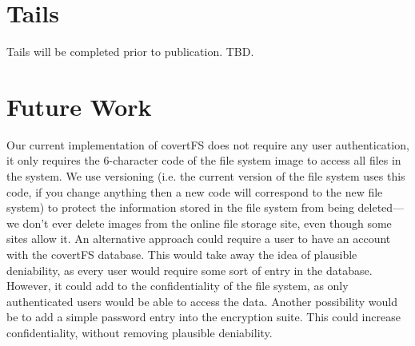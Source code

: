 \documentclass[12pt,journal,compsoc]{IEEEtran}
\begin{document}





\section{Tails}

Tails will be completed prior to publication. TBD. 

\section{Future Work}
Our current implementation of covertFS does not require any user authentication, it only requires the 6-character code of the file system image to access all files in the system. We use versioning (i.e. the current version of the file system uses this code, if you change anything then a new code will correspond to the new file system) to protect the information stored in the file system from being deleted--- we don't ever delete images from the online file storage site, even though some sites allow it. An alternative approach could require a user to have an account with the covertFS database. This would take away the idea of plausible deniability, as every user would require some sort of entry in the database. However, it could add to the confidentiality of the file system, as only authenticated users would be able to access the data.
Another possibility would be to add a simple password entry into the encryption suite. This could increase confidentiality, without removing plausible deniability.
\end{document}
